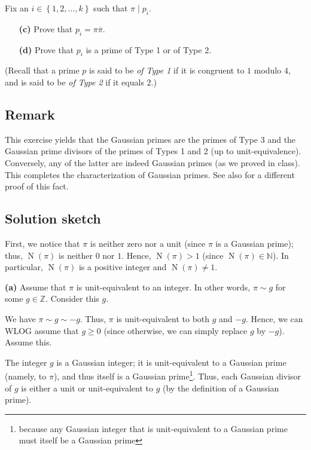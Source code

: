 \documentclass[paper=a4, fontsize=12pt]{scrartcl}%
\theoremstyle{plainsl}
\theoremstyle{definition}
\theoremstyle{remark}
\begin{document}
Fix an $i \in\left\{  1, 2, \ldots, k \right\}  $ such that $\pi\mid p_{i}$.

\begin{enumerate}
\item[\textbf{(c)}] Prove that $p_{i} = \pi\overline{\pi}$.

\item[\textbf{(d)}] Prove that $p_{i}$ is a prime of Type 1 or of Type 2.
\end{enumerate}

\noindent(Recall that a prime $p$ is said to be \textit{of Type 1} if it is
congruent to $1$ modulo $4$, and is said to be \textit{of Type 2} if it equals
$2$.)

\subsection{Remark}

This exercise yields that the Gaussian primes are the primes of Type 3 and the
Gaussian prime divisors of the primes of Types 1 and 2 (up to
unit-equivalence). Conversely, any of the latter are indeed Gaussian primes
(as we proved in class). This completes the characterization of Gaussian
primes. See also \cite[Theorem 9.9]{Conrad-Gauss} for a different proof of
this fact.

\subsection{Solution sketch}

First, we notice that $\pi$ is neither zero nor a unit (since $\pi$ is a
Gaussian prime); thus, $\operatorname*{N}\left(  \pi\right)  $ is neither $0$
nor $1$. Hence, $\operatorname*{N}\left(  \pi\right)  >1$ (since
$\operatorname*{N}\left(  \pi\right)  \in\mathbb{N}$). In particular,
$\operatorname*{N}\left(  \pi\right)  $ is a positive integer and
$\operatorname*{N}\left(  \pi\right)  \neq1$.

\bigskip

\textbf{(a)} Assume that $\pi$ is unit-equivalent to an integer. In other
words, $\pi\sim g$ for some $g\in\mathbb{Z}$. Consider this $g$.

We have $\pi\sim g\sim-g$. Thus, $\pi$ is unit-equivalent to both $g$ and
$-g$. Hence, we can WLOG assume that $g\geq0$ (since otherwise, we can simply
replace $g$ by $-g$). Assume this.

The integer $g$ is a Gaussian integer;
it is unit-equivalent to a Gaussian prime (namely, to $\pi$),
and thus itself is a Gaussian prime\footnote{because any
Gaussian integer that is unit-equivalent to a Gaussian prime must
itself be a Gaussian prime}.
Thus, each Gaussian divisor of $g$ is either a unit or unit-equivalent to
$g$ (by the definition of a Gaussian prime).
\end{document}
